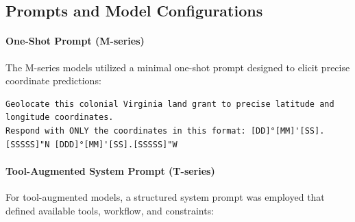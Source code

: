 \subsection{Prompts and Model Configurations}\label{sec:prompts}

\paragraph{One-Shot Prompt
(M-series)}\label{a.2.1-one-shot-prompt-m-series}

The M-series models utilized a minimal one-shot prompt designed to
elicit precise coordinate predictions:

\begin{lstlisting}
Geolocate this colonial Virginia land grant to precise latitude and longitude coordinates.
Respond with ONLY the coordinates in this format: [DD]°[MM]'[SS].[SSSSS]"N [DDD]°[MM]'[SS].[SSSSS]"W
\end{lstlisting}

\paragraph{Tool-Augmented System Prompt
(T-series)}\label{a.2.2-tool-augmented-system-prompt-t-series}

For tool-augmented models, a structured system prompt was employed that
defined available tools, workflow, and constraints:

